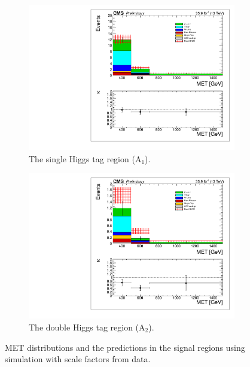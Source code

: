 \begin{figure}[htbp]
\begin{subfigure}[b]{0.5\textwidth}
\centering
\includegraphics[trim={5px 5px 5px 5px},clip,width=\textwidth]{figs/SUS17006/MCclosureSF_singleHiggsRegionTotal.pdf}
\caption{The single Higgs tag region (A$_{1}$).}
\end{subfigure}
\begin{subfigure}[b]{0.5\textwidth}
\centering
\includegraphics[trim={5px 5px 5px 5px},clip,width=\textwidth]{figs/SUS17006/MCclosureSF_doubleHiggsRegionTotal.pdf} 
\caption{The double Higgs tag region (A$_{2}$).}
\end{subfigure}
\caption{MET distributions and the predictions in the signal regions using simulation with scale factors from data.}
\label{fig:mcclosuresf}
\end{figure}

